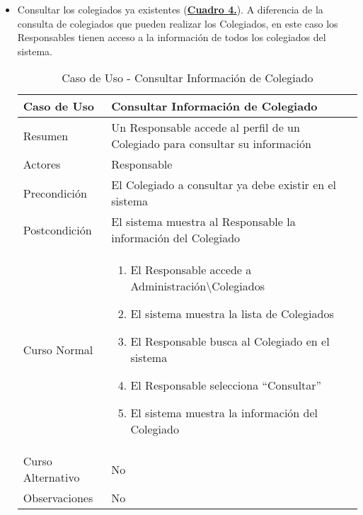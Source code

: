 \begin{itemize}
	\item \addtocounter{tabla}{1} Consultar los colegiados ya existentes (\textbf{\hyperref[tab:curConsultaInfoColeg]{Cuadro 4.}}). A diferencia de la consulta de colegiados que pueden realizar los Colegiados, en este caso los Responsables tienen acceso a la información de todos los colegiados del sistema.
		\begin{table}[!htbp]
		  \centering  \addtocounter{casouso}{1}
		  \begin{tabular}{|l | p{100mm}|}
		    \textbf{Caso de Uso}  & \textbf{Consultar Información de Colegiado} \\ \hline
		    Resumen 		 & Un Responsable accede al perfil de un Colegiado para consultar su información \\ \hline
		    Actores  		 & Responsable \\ \hline
		    Precondición  	 & El Colegiado a consultar ya debe existir en el sistema \\ \hline
		    Postcondición  	 & El sistema muestra al Responsable la información del Colegiado \\ \hline
		    Curso Normal   	 & \begin{enumerate}
			  \item El Responsable accede a Administración\textbackslash Colegiados
			  \item El sistema muestra la lista de Colegiados
			  \item El Responsable busca al Colegiado en el sistema
			  \item El Responsable selecciona ``Consultar''
			  \item El sistema muestra la información del Colegiado
		    \end{enumerate}  \\ \hline
		    Curso Alternativo  & No  \\ \hline
		    Observaciones 	 & No \\ \hline
		  \end{tabular}
		  \caption{Caso de Uso  - Consultar Información de Colegiado}
		  \label{tab:curConsultaInfoColeg}
		\end{table}
		\FloatBarrier


\end{itemize}
